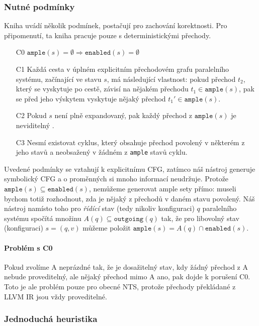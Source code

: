 \documentclass[10pt,a4paper,notitlepage]{report}
\begin{document}
\subsubsection{Nutné podmínky}
Kniha \cite{CLARKE} uvádí několik podmínek, postačují pro zachování korektnosti. Pro připomenutí, ta kniha pracuje pouze s deterministickými přechody. 

\begin{enumerate}
\item[C0] $\texttt{ample}(s) = \emptyset \Rightarrow \texttt{enabled}(s) = \emptyset$
\item[C1] Každá cesta v úplném explicitním přechodovém grafu paralelního systému, začínající ve stavu $s$, má následující vlastnost: pokud přechod $t_2$, který se vyskytuje po cestě, závisí na nějakém přechodu $t_1 \in \texttt{ample}(s)$, pak se před jeho výskytem vyskytuje nějaký přechod $t_1' \in \texttt{ample}(s)$.
\item[C2] Pokud $s$ není plně expandovaný, pak každý přechod z $\texttt{ample}(s)$ je neviditelný .
\item[C3] Nesmí existovat cyklus, který obsahuje přechod povolený v některém z jeho stavů a neobsažený v žádném z \texttt{ample} stavů cyklu.
\end{enumerate}

Uvedené podmínky se vztahují k explicitnímu CFG, zatímco náš nástroj generuje symbolický CFG a o proměnných si mnoho informací neudržuje. Protože $\texttt{ample}(s) \subseteq \texttt{enabled}(s)$, nemůžeme generovat ample sety přímo: museli bychom totiž rozhodnout, zda je nějaký z přechodů v daném stavu povolený. Náš nástroj namísto toho pro \textit{řídící} stav (tedy nikoliv konfiguraci) $q$ paralelního systému spočítá množinu $A(q) \subseteq \texttt{outgoing}(q)$ tak, že pro libovolný stav (konfiguraci) $s = (q, v)$ můžeme položit $\texttt{ample}(s) = A(q) \cap \texttt{enabled}(s)$.

\paragraph{Problém s C0}
Pokud zvolíme A neprázdné tak, že je dosažitelný stav, kdy žádný přechod z A nebude proveditelný, ale nějaký přechod mimo A ano, pak dojde k porušení C0. Toto je ale problém pouze pro obecné NTS, protože přechody překládané z LLVM IR jsou vždy proveditelné.


\subsubsection{Jednoduchá heuristika}
\end{document}
